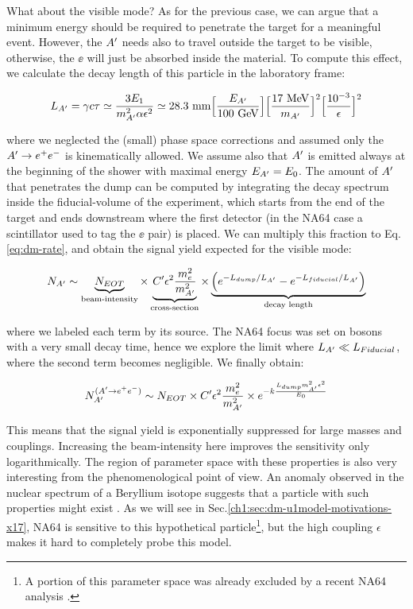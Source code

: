 What about the visible mode? As for the previous case, we can argue that a minimum energy should be required to penetrate the target for a meaningful event. However, the $A'$ needs also to travel outside the target to be visible, otherwise, the $\ee$ will just be absorbed inside the material. To compute this effect, we calculate the decay length of this particle in the laboratory frame:

\begin{eqnarray}
  L_{A'} = \gamma c \tau \simeq \frac{3E_1}{m^2_{A'}\alpha \epsilon^2} \simeq 28.3 ~{\rm mm}  \Bigl[\frac{E_{A'}}{100~ {\rm GeV}}\Bigr] 
  \Bigl[\frac{17~ {\rm MeV}}{m_{A'}}\Bigr]^2 \Bigl[\frac{10^{-3}}{\epsilon}\Bigr]^2
  \label{eq:dm-decay-length}
\end{eqnarray}

where we neglected the (small) phase space corrections and assumed only the $A' \to e^+e^-$ is kinematically allowed. We assume also that $A'$ is emitted always at the beginning of the shower with maximal energy $E_{A'} = E_0$. The amount of $A'$ that penetrates the dump can be computed by integrating the decay spectrum inside the fiducial-volume of the experiment, which starts from the end of the target and ends downstream where the first detector (in the NA64 case a scintillator used to tag the $\ee$ pair) is placed. We can multiply this fraction to Eq.\ref{eq:dm-rate}, and obtain the signal yield expected for the visible mode:

\begin{equation}
  \label{eq:dm-rate-vis}
    N_{A'} \sim \underbrace{N_{EOT}}_{\textrm{beam-intensity}} \times \underbrace{C' \epsilon^2 \frac{m_e^2}{m^2_{A'}}}_{\textrm{cross-section}} \times \underbrace{\left(e^{- L_{dump}/L_{A'}} - e^{-L_{fiducial}/L_{A'}}\right)}_{\textrm{decay length}}
  \end{equation}

  where we labeled each term by its source. The NA64 focus was set on bosons with a very small decay time, hence we explore the limit where $L_{A'} \ll L_{Fiducial}$, where the second term becomes negligible. We finally obtain:

  \begin{equation}
    \label{eq:dm-rate-vis-limit}
    N_{A'}^{(A' \to e^+e^-)} \sim N_{EOT} \times C' \epsilon^2 \frac{m_e^2}{m^2_{A'}} \times e^{-k\frac{L_{dump} m^2_{A'}\epsilon^2}{E_0}}
  \end{equation}

  This means that the signal yield is exponentially suppressed for large masses and couplings. Increasing the beam-intensity here improves the sensitivity only logarithmically. The region of parameter space with these properties is also very interesting from the phenomenological point of view. An anomaly observed in the nuclear spectrum of a Beryllium isotope suggests that a particle with such properties might exist \cite{Krasznahorkay:2015iga}. As we will see in Sec.\ref{ch1:sec:dm-u1model-motivations-x17}, NA64 is sensitive to this hypothetical particle\footnote{A portion of this parameter space was already excluded by a recent NA64 analysis \cite{Banerjee:2019hmi,Banerjee:2018vgk}.}, but the high coupling $\epsilon$ makes it hard to completely probe this model.

